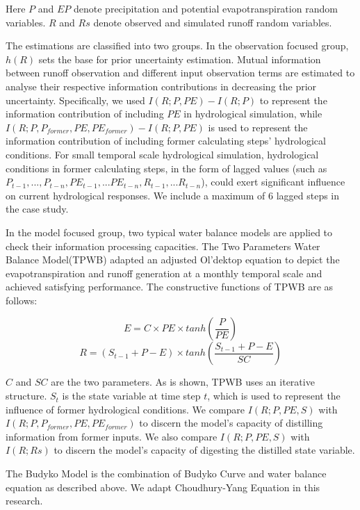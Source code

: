 \documentclass[draft,wrr]{AGUTeX}
\begin{document}
\begin{article}
Here $P$ and $EP$ denote precipitation and potential evapotranspiration random variables. $R$ and $Rs$ denote observed and simulated runoff random variables. 

The estimations are classified into two groups. In the observation focused group, $h(R)$ sets the base for prior uncertainty estimation. Mutual information between runoff observation and different input observation terms are estimated to analyse their respective information contributions in decreasing the prior uncertainty. Specifically, we used $I(R;P,PE)-I(R;P)$ to represent the information contribution of including $PE$ in hydrological simulation, while $I(R;P,P_{former},PE,PE_{former})-I(R;P,PE)$ is used to represent the information contribution of including  former calculating steps' hydrological conditions. For small temporal scale hydrological simulation, hydrological conditions in former calculating steps, in the form of lagged values (such as $P_{t-1},...,P_{t-n},PE_{t-1},...PE_{t-n},R_{t-1},...R_{t-n}$), could exert significant influence on current hydrological responses. We include a maximum of 6 lagged steps in the case study.     

In the model focused group, two typical water balance models are applied to check their information processing capacities. The Two Parameters Water Balance Model(TPWB)\citep{xiong1999two} adapted an adjusted Ol'dektop equation\citep{jobson1982evaporation} to depict the evapotranspiration and runoff generation at a monthly temporal scale and achieved satisfying performance. The constructive functions of TPWB are as follows:

 \begin{equation}
E=C\times PE \times tanh(\frac{P}{PE})
 \end{equation}
 \begin{equation}
R=(S_{t-1}+P-E)\times tanh(\frac{S_{t-1}+P-E}{SC})
 \end{equation}
 
$C$ and $SC$ are the two parameters. As is shown, TPWB uses an iterative structure. $S_t$ is the state variable at time step $t$, which is used to  represent the influence of former hydrological conditions. We compare $I(R;P,PE,S)$ with $I(R;P,P_{former},PE,PE_{former})$ to discern the model's capacity of distilling information from former inputs. We also compare $I(R;P,PE,S)$ with $I(R;Rs)$ to discern the model's capacity of digesting the distilled state variable.

 The Budyko Model is the combination of Budyko Curve and water balance equation as described above. We adapt Choudhury-Yang Equation in this research.  


\end{article}
\end{document}
